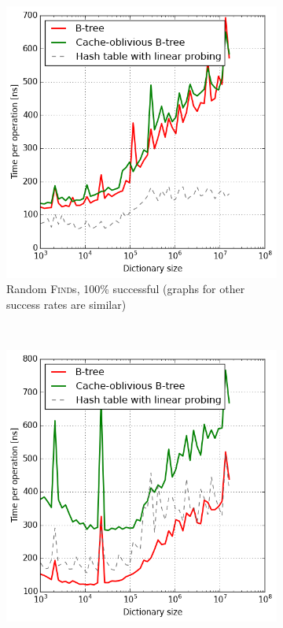 \begin{figure}
\centering
\begin{subfigure}[t]{0.45\textwidth}
	\includegraphics[width=\textwidth]{img/performance/cob-performance-1-100}
	\caption{Random \textsc{Find}s, 100\% successful (graphs for
		other success rates are similar)}
\end{subfigure}
~
\begin{subfigure}[t]{0.45\textwidth}
	\includegraphics[width=\textwidth]{img/performance/cob-performance-2}

\end{subfigure}
\end{figure}
